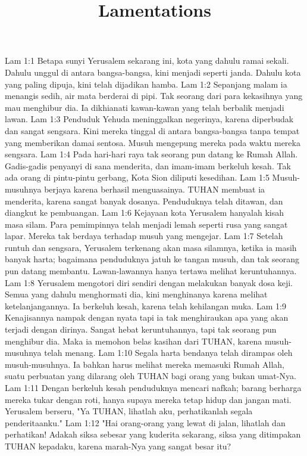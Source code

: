 

\title{Lamentations}

Lam 1:1  Betapa sunyi Yerusalem sekarang ini, kota yang dahulu ramai sekali. Dahulu unggul di antara bangsa-bangsa, kini menjadi seperti janda. Dahulu kota yang paling dipuja, kini telah dijadikan hamba.
Lam 1:2  Sepanjang malam ia menangis sedih, air mata berderai di pipi. Tak seorang dari para kekasihnya yang mau menghibur dia. Ia dikhianati kawan-kawan yang telah berbalik menjadi lawan.
Lam 1:3  Penduduk Yehuda meninggalkan negerinya, karena diperbudak dan sangat sengsara. Kini mereka tinggal di antara bangsa-bangsa tanpa tempat yang memberikan damai sentosa. Musuh mengepung mereka pada waktu mereka sengsara.
Lam 1:4  Pada hari-hari raya tak seorang pun datang ke Rumah Allah. Gadis-gadis penyanyi di sana menderita, dan imam-imam berkeluh kesah. Tak ada orang di pintu-pintu gerbang, Kota Sion diliputi kesedihan.
Lam 1:5  Musuh-musuhnya berjaya karena berhasil menguasainya. TUHAN membuat ia menderita, karena sangat banyak dosanya. Penduduknya telah ditawan, dan diangkut ke pembuangan.
Lam 1:6  Kejayaan kota Yerusalem hanyalah kisah masa silam. Para pemimpinnya telah menjadi lemah seperti rusa yang sangat lapar. Mereka tak berdaya terhadap musuh yang mengejar.
Lam 1:7  Setelah runtuh dan sengsara, Yerusalem terkenang akan masa silamnya, ketika ia masih banyak harta; bagaimana penduduknya jatuh ke tangan musuh, dan tak seorang pun datang membantu. Lawan-lawannya hanya tertawa melihat keruntuhannya.
Lam 1:8  Yerusalem mengotori diri sendiri dengan melakukan banyak dosa keji. Semua yang dahulu menghormati dia, kini menghinanya karena melihat ketelanjangannya. Ia berkeluh kesah, karena telah kehilangan muka.
Lam 1:9  Kenajisannya nampak dengan nyata tapi ia tak menghiraukan apa yang akan terjadi dengan dirinya. Sangat hebat keruntuhannya, tapi tak seorang pun menghibur dia. Maka ia memohon belas kasihan dari TUHAN, karena musuh-musuhnya telah menang.
Lam 1:10  Segala harta bendanya telah dirampas oleh musuh-musuhnya. Ia bahkan harus melihat mereka memasuki Rumah Allah, suatu perbuatan yang dilarang oleh TUHAN bagi orang yang bukan umat-Nya.
Lam 1:11  Dengan berkeluh kesah penduduknya mencari nafkah; barang berharga mereka tukar dengan roti, hanya supaya mereka tetap hidup dan jangan mati. Yerusalem berseru, "Ya TUHAN, lihatlah aku, perhatikanlah segala penderitaanku."
Lam 1:12  "Hai orang-orang yang lewat di jalan, lihatlah dan perhatikan! Adakah siksa sebesar yang kuderita sekarang, siksa yang ditimpakan TUHAN kepadaku, karena marah-Nya yang sangat besar itu?
